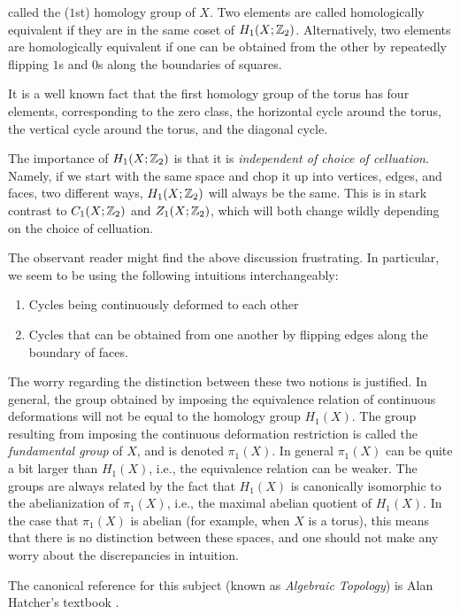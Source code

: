 \documentclass{article}
\theoremstyle{definition}
\numberwithin{figure}{section}
\begin{document}
called the ($1$st) homology group of $X$. Two elements are called homologically equivalent if they are in the same coset of $H_1(X;\mathbb{Z}_2)$. Alternatively, two elements are homologically equivalent if one can be obtained from the other by repeatedly flipping $1$s and $0$s along the boundaries of squares.

It is a well known fact that the first homology group of the torus has four elements, corresponding to the zero class, the horizontal cycle around the torus, the vertical cycle around the torus, and the diagonal cycle.

The importance of $H_1(X;\mathbb{Z}_2)$ is that it is \textit{independent of choice of celluation}. Namely, if we start with the same space and chop it up into vertices, edges, and faces, two different ways, $H_1(X;\mathbb{Z}_2)$ will always be the same. This is in stark contrast to $C_1(X;\mathbb{Z}_2)$ and $Z_1(X;\mathbb{Z}_2)$, which will both change wildly depending on the choice of celluation.

The observant reader might find the above discussion frustrating. In particular, we seem to be using the following intuitions interchangeably:

\begin{enumerate}
\item Cycles being continuously deformed to each other
\item Cycles that can be obtained from one another by flipping edges along the boundary of faces.
\end{enumerate}

The worry regarding the distinction between these two notions is justified. In general, the group obtained by imposing the equivalence relation of continuous deformations will not be equal to the homology group $H_1(X)$. The group resulting from imposing the continuous deformation restriction is called the \textit{fundamental group} of $X$, and is denoted $\pi_1(X)$. In general $\pi_1(X)$ can be quite a bit larger than $H_1(X)$, i.e., the equivalence relation can be weaker. The groups are always related by the fact that $H_1(X)$ is canonically isomorphic to the abelianization of $\pi_1(X)$, i.e., the maximal abelian quotient of $H_1(X)$. In the case that $\pi_1(X)$ is abelian (for example, when $X$ is a torus), this means that there is no distinction between these spaces, and one should not make any worry about the discrepancies in intuition.

The canonical reference for this subject (known as \textit{Algebraic Topology}) is Alan Hatcher's textbook \cite{hatcher2005algebraic}.
\end{document}
